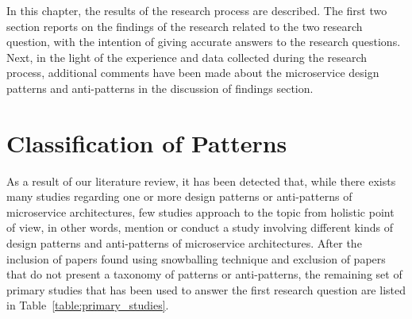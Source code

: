 \documentclass{Configuration_Files/PoliMi3i_thesis}
\begin{document}
In this chapter, the results of the research process are described.
The first two section reports on the findings of the research related to the two research question, with the intention of giving accurate answers to the research questions.
Next, in the light of the experience and data collected during the research process, additional comments have been made about the microservice design patterns and anti-patterns in the discussion of findings section.

\section{Classification of Patterns}
\label{subsec:classification_result}

As a result of our literature review, it has been detected that, while there exists many studies regarding one or more design patterns or anti-patterns of microservice architectures, few studies approach to the topic from holistic point of view, in other words, mention or conduct a study involving different kinds of design patterns and anti-patterns of microservice architectures.
After the inclusion of papers found using snowballing technique and exclusion of papers that do not present a taxonomy of patterns or anti-patterns, the remaining set of primary studies that has been used to answer the first research question are listed in Table~\ref{table:primary_studies}. 
\end{document}
